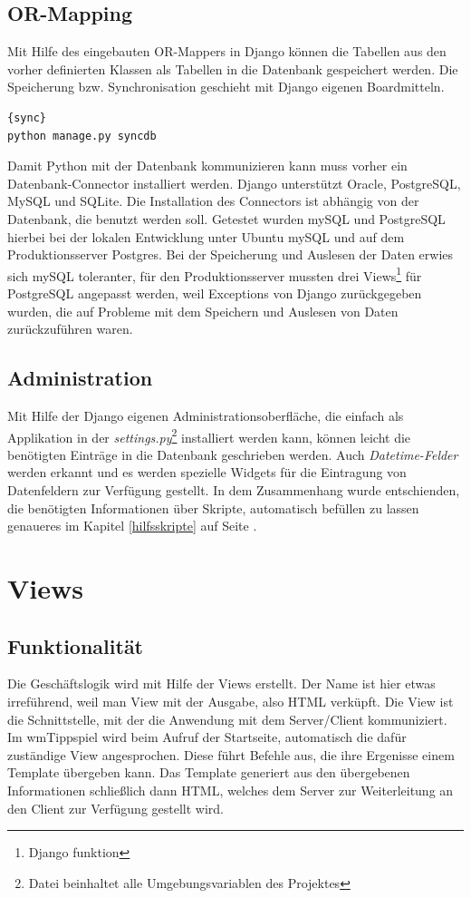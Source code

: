 \documentclass[titlepage, 12pt,a4paper]{scrartcl}
\begin{document}
\subsection{OR-Mapping}
Mit Hilfe des eingebauten OR-Mappers in Django können die Tabellen aus den
vorher definierten Klassen als Tabellen in die Datenbank gespeichert werden.
Die Speicherung bzw. Synchronisation geschieht mit Django eigenen Boardmitteln.

\begin{lstlisting}[caption=Datenbanksynchronisation]{sync}
python manage.py syncdb
\end{lstlisting}

Damit Python mit der Datenbank kommunizieren kann muss vorher ein
Datenbank-Connector installiert werden. Django unterstützt Oracle, PostgreSQL,
MySQL und SQLite. Die Installation des Connectors ist abhängig von der
Datenbank, die benutzt werden soll. Getestet wurden mySQL und PostgreSQL
hierbei bei der lokalen Entwicklung unter Ubuntu mySQL und auf dem
Produktionsserver Postgres. Bei der Speicherung und Auslesen der Daten erwies
sich mySQL toleranter, für den Produktionsserver mussten drei
Views\footnote{Django funktion} für PostgreSQL angepasst werden, weil
Exceptions von Django zurückgegeben wurden, die auf Probleme mit dem Speichern
und Auslesen von Daten zurückzuführen waren.

\subsection{Administration}
Mit Hilfe der Django eigenen Administrationsoberfläche, die einfach als
Applikation in der \emph{settings.py}\footnote{Datei beinhaltet alle
Umgebungsvariablen des Projektes} installiert werden kann, können leicht die
benötigten Einträge in die Datenbank geschrieben werden. Auch
\emph{Datetime-Felder} werden erkannt und es werden spezielle Widgets für die
Eintragung von Datenfeldern zur Verfügung gestellt. In dem Zusammenhang wurde
entschienden, die benötigten Informationen über Skripte, automatisch befüllen zu
lassen genaueres im Kapitel \ref{hilfsskripte} auf Seite \pageref{hilfsskripte}. 


\section{Views}
\subsection{Funktionalität}
Die Geschäftslogik wird mit Hilfe der Views erstellt. Der Name ist hier etwas
irreführend, weil man View mit der Ausgabe, also HTML verküpft. Die View ist die
Schnittstelle, mit der die Anwendung mit dem Server/Client kommuniziert. Im
wmTippspiel wird beim Aufruf der Startseite, automatisch die dafür zuständige
View angesprochen. Diese führt Befehle aus, die ihre Ergenisse einem Template
übergeben kann. Das Template generiert aus den übergebenen Informationen
schließlich dann HTML, welches dem Server zur Weiterleitung an den Client zur
Verfügung gestellt wird.
\end{document}
